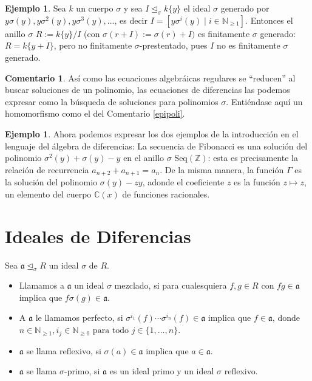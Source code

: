 \documentclass[12pt,a4paper,BCOR15mm,twoside,DIV12]{article}
\def\N{\mathbb{N}}
\def\NE{\mathbb{N}_{\geq 1}}
\def\Z{\mathbb{Z}}
\def\C{\mathbb{C}}
\def\fa{\text{ para todo }}
\def\a{\mathfrak{a}}
\def\s{\sigma}
\def\si{\unlhd_{\sigma}}
\theoremstyle{definition}
\newtheorem{ex}[Satz]{Ejemplo}
\newtheorem{rem}[Satz]{Comentario}
\begin{document}
\begin{ex}
Sea $k$ un cuerpo $\s$ y sea $I \si k\{y\} $ el ideal $\s$ generado por $y\s(y), y\s^2(y), y\s^3(y), \ldots$, es decir $I = [y \s^i(y) \mid i \in \NE]$. Entonces el anillo $\s$ $R := k\{y\}/I$ (con $\s (r + I) := \s(r) + I)$ es 
finitamente $\s$ generado: $R = k\{ y + I \}$, pero no finitamente $\s$-prestentado, pues $I$ no es finitamente $\s$ generado.
\end{ex}

\begin{rem}
Así como las ecuaciones algebráicas regulares se ``reducen'' al buscar soluciones de un polinomio, 
las ecuaciones de diferencias las podemos expresar como la búsqueda de soluciones para  polinomios $\sigma$. Entiéndase aquí un homomorfismo como el del Comentario \ref{epipoli}.
\end{rem}

\begin{ex}
Ahora podemos expresar los dos ejemplos de la introducción en el lenguaje del álgebra de diferencias:
La secuencia de Fibonacci es una solución del polinomio $\sigma^2(y) + \sigma(y) - y$ en el anillo $\sigma$ $\text{Seq}(\Z)$: esta es precisamente la relación de recurrencia $a_{n+2} + a_{n+1} = a_n$.
De la misma manera, la función $\Gamma$ es la solución del polinomio $\sigma(y) - zy$, adonde el coeficiente $z$ es la función $z \mapsto z$, un elemento del cuerpo $\C(x)$ de funciones racionales.
\end{ex}

\section{Ideales de Diferencias}

Sea  $\a \si R$ un ideal $\s$ de $R$. 
\begin{itemize}
\item Llamamos a  $\a$ un ideal $\s$ mezclado, si para cualesquiera $f,g \in R$ con $fg \in \a$ implica que $f \sigma(g) \in \a$.
\item A $\a$ le llamamos perfecto, si $\sigma^{i_1}(f) \cdots \sigma^{i_n}(f) \in \a$ implica que $f \in \a$, donde $n \in \N_{\geq1}, i_j \in \N_{\geq0} \fa j \in \{1,\ldots,n\}$.
\item $\a$ se llama reflexivo, si $\s(a) \in \a$ implica que $a \in \a$.
\item $\a$ se llama $\s$-primo, si $\a$ es un ideal primo y un ideal $\s$ reflexivo.
\end{itemize}
\end{document}
